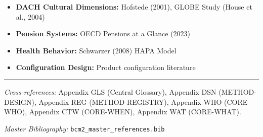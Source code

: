 \begin{itemize}[nosep]
    \item \textbf{DACH Cultural Dimensions:} Hofstede (2001), GLOBE Study (House et al., 2004)
    \item \textbf{Pension Systems:} OECD Pensions at a Glance (2023)
    \item \textbf{Health Behavior:} Schwarzer (2008) HAPA Model
    \item \textbf{Configuration Design:} Product configuration literature
\end{itemize}

\nocite{bcm_master}



\vspace{1em}
\hrule
\vspace{0.5em}

\noindent\textit{Cross-references:}
Appendix GLS (Central Glossary),
Appendix DSN (METHOD-DESIGN),
Appendix REG (METHOD-REGISTRY),
Appendix WHO (CORE-WHO),
Appendix CTW (CORE-WHEN),
Appendix WAT (CORE-WHAT).

\noindent\textit{Master Bibliography:} \texttt{bcm2\_master\_references.bib}


